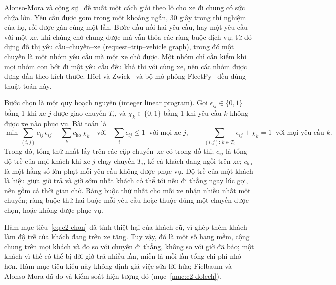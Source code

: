 Alonso-Mora và cộng sự~\cite{alonsomora2017} đề xuất một cách giải theo lô cho xe đi chung có sức chứa lớn. Yêu cầu
được gom trong một khoảng ngắn, 30 giây trong thí nghiệm của họ, rồi được gán cùng một lần. Bước đầu nối hai yêu cầu,
hay một yêu cầu với một xe, khi chúng chở chung được mà vẫn thỏa các ràng buộc dịch vụ; từ đó dựng đồ thị
yêu cầu--chuyến--xe (request--trip--vehicle graph), trong đó một chuyến là một nhóm yêu cầu mà một xe chở được. Một
nhóm chỉ cần kiểm khi mọi nhóm con bớt đi một yêu cầu đều khả thi với cùng xe, nên các nhóm được dựng dần theo kích
thước. Hörl và Zwick~\cite{horl2022} và bộ mô phỏng FleetPy~\cite{engelhardt2026} đều dùng thuật toán này.

Bước chọn là một quy hoạch nguyên (integer linear program). Gọi $\epsilon_{ij} \in \{0, 1\}$ bằng 1 khi xe $j$ được
giao chuyến $T_i$, và $\chi_k \in \{0, 1\}$ bằng 1 khi yêu cầu $k$ không được xe nào phục vụ. Bài toán là
\begin{equation}
\min \sum_{(i,j)} c_{ij}\,\epsilon_{ij} + \sum_{k} c_{\mathrm{ko}}\,\chi_k
\quad\text{với}\quad
\sum_{i} \epsilon_{ij} \le 1 \;\;\text{với mọi xe } j, \qquad
\sum_{(i,j):\, k \in T_i} \epsilon_{ij} + \chi_k = 1 \;\;\text{với mọi yêu cầu } k .
\label{eq:c2-chon}
\end{equation}
Trong đó, tổng thứ nhất lấy trên các cặp chuyến--xe có trong đồ thị; $c_{ij}$ là tổng độ trễ của mọi khách khi xe $j$
chạy chuyến $T_i$, kể cả khách đang ngồi trên xe; $c_{\mathrm{ko}}$ là một hằng số lớn phạt mỗi yêu cầu không được
phục vụ. Độ trễ của một khách là hiệu giữa giờ trả và giờ sớm nhất khách có thể tới nếu đi thẳng ngay lúc gọi, nên
gồm cả thời gian chờ. Ràng buộc thứ nhất cho mỗi xe nhận nhiều nhất một chuyến; ràng buộc thứ hai buộc mỗi yêu cầu
hoặc thuộc đúng một chuyến được chọn, hoặc không được phục vụ.

Hàm mục tiêu~\eqref{eq:c2-chon} đã tính thiệt hại của khách cũ, vì ghép thêm khách làm độ trễ của khách đang trên xe
tăng. Tuy vậy, đó là một số hạng mềm, cộng chung trên mọi khách và đo so với chuyến đi thẳng, không so với giờ đã báo;
một khách vì thế có thể bị dời giờ trả nhiều lần, miễn là mỗi lần tổng chi phí nhỏ hơn. Hàm mục tiêu kiểu này không
định giá việc sửa lời hứa; Fielbaum và Alonso-Mora đã đo và kiểm soát hiện tượng đó (mục~\ref{muc:c2-dolech}).

